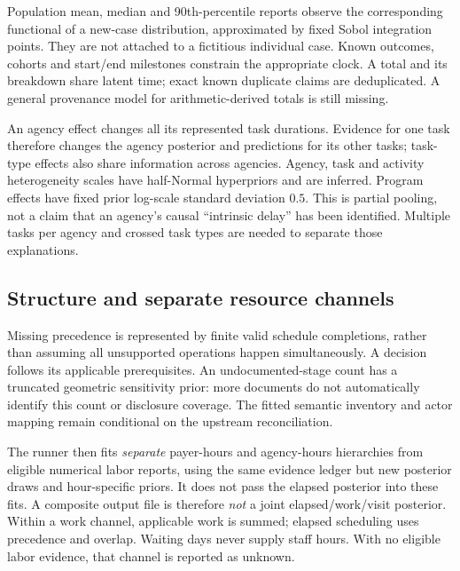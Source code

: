 \documentclass[10pt]{article}
\begin{document}
Population mean, median and 90th-percentile reports observe the corresponding
functional of a new-case distribution, approximated by fixed Sobol integration
points. They are not attached to a fictitious individual case. Known outcomes,
cohorts and start/end milestones constrain the appropriate clock. A total and
its breakdown share latent time; exact known duplicate claims are deduplicated.
A general provenance model for arithmetic-derived totals is still missing.

An agency effect changes all its represented task durations. Evidence for one
task therefore changes the agency posterior and predictions for its other tasks;
task-type effects also share information across agencies. Agency, task and
activity heterogeneity scales have half-Normal hyperpriors and are inferred.
Program effects have fixed prior log-scale standard deviation $0.5$. This is partial pooling, not a
claim that an agency's causal ``intrinsic delay'' has been identified. Multiple
tasks per agency and crossed task types are needed to separate those explanations.

\subsection*{Structure and separate resource channels}
Missing precedence is represented by finite valid schedule completions, rather
than assuming all unsupported operations happen simultaneously. A decision follows
its applicable prerequisites. An undocumented-stage count has a truncated
geometric sensitivity prior: more documents do not automatically identify this
count or disclosure coverage. The fitted semantic inventory and actor mapping
remain conditional on the upstream reconciliation.

The runner then fits \emph{separate} payer-hours and agency-hours hierarchies from
eligible numerical labor reports, using the same evidence ledger but new posterior
draws and hour-specific priors. It does not pass the elapsed posterior into these
fits. A composite output file is therefore \emph{not} a joint elapsed/work/visit
posterior. Within a work channel, applicable work is summed; elapsed scheduling
uses precedence and overlap. Waiting days never supply staff hours. With no
eligible labor evidence, that channel is reported as unknown.
\end{document}
